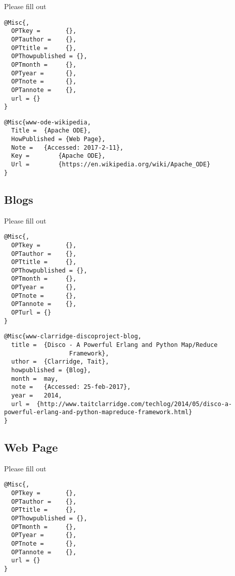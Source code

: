 Please fill out

\begin{verbatim}
@Misc{,
  OPTkey =       {},
  OPTauthor =    {},
  OPTtitle =     {},
  OPThowpublished = {},
  OPTmonth =     {},
  OPTyear =      {},
  OPTnote =      {},
  OPTannote =    {},
  url = {}
}
\end{verbatim}

\begin{verbatim}
@Misc{www-ode-wikipedia,
  Title =  {Apache ODE},
  HowPublished = {Web Page},
  Note =   {Accessed: 2017-2-11},
  Key =        {Apache ODE},
  Url =        {https://en.wikipedia.org/wiki/Apache_ODE}
}
\end{verbatim}

\subsection{Blogs}\label{blogs}

Please fill out

\begin{verbatim}
@Misc{,
  OPTkey =       {},
  OPTauthor =    {},
  OPTtitle =     {},
  OPThowpublished = {},
  OPTmonth =     {},
  OPTyear =      {},
  OPTnote =      {},
  OPTannote =    {},
  OPTurl = {}
}
\end{verbatim}

\begin{verbatim}
@Misc{www-clarridge-discoproject-blog,
  title =  {Disco - A Powerful Erlang and Python Map/Reduce
                  Framework},
  uthor =  {Clarridge, Tait},
  howpublished = {Blog},
  month =  may,
  note =   {Accessed: 25-feb-2017},
  year =   2014,
  url =  {http://www.taitclarridge.com/techlog/2014/05/disco-a-powerful-erlang-and-python-mapreduce-framework.html}
}
\end{verbatim}

\subsection{Web Page}\label{s:e:web-page}

Please fill out

\begin{verbatim}
@Misc{, 
  OPTkey =       {}, 
  OPTauthor =    {}, 
  OPTtitle =     {}, 
  OPThowpublished = {}, 
  OPTmonth =     {}, 
  OPTyear =      {}, 
  OPTnote =      {},
  OPTannote =    {},
  url = {}
}
\end{verbatim}


